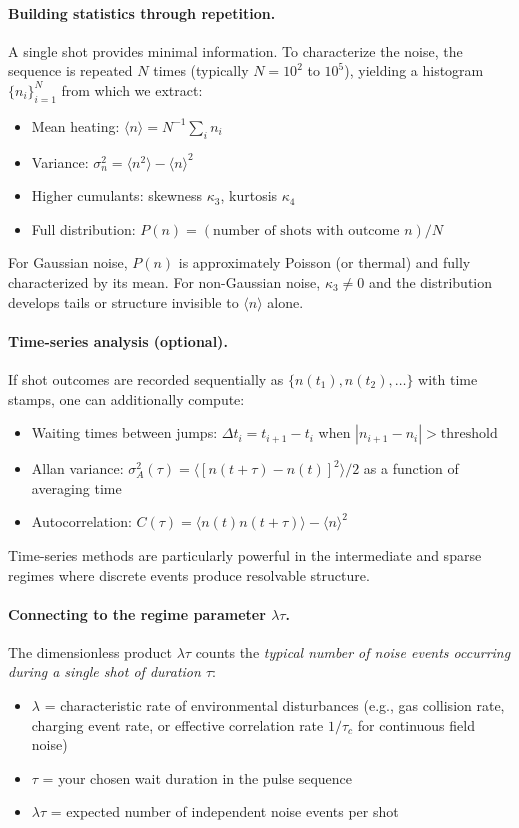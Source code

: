 \paragraph{Building statistics through repetition.}
A single shot provides minimal information. To characterize the noise, the sequence is repeated $N$ times (typically $N = 10^2$ to $10^5$), yielding a histogram $\{n_i\}_{i=1}^N$ from which we extract:
\begin{itemize}[nosep]
\item Mean heating: $\langle n \rangle = N^{-1} \sum_i n_i$
\item Variance: $\sigma^2_n = \langle n^2 \rangle - \langle n \rangle^2$
\item Higher cumulants: skewness $\kappa_3$, kurtosis $\kappa_4$
\item Full distribution: $P(n) = (\text{number of shots with outcome } n)/N$
\end{itemize}
For Gaussian noise, $P(n)$ is approximately Poisson (or thermal) and fully characterized by its mean. For non-Gaussian noise, $\kappa_3 \neq 0$ and the distribution develops tails or structure invisible to $\langle n \rangle$ alone.

\paragraph{Time-series analysis (optional).}
If shot outcomes are recorded sequentially as $\{n(t_1), n(t_2), \ldots\}$ with time stamps, one can additionally compute:
\begin{itemize}[nosep]
\item Waiting times between jumps: $\Delta t_i = t_{i+1} - t_i$ when $|n_{i+1} - n_i| > \text{threshold}$
\item Allan variance: $\sigma^2_A(\tau) = \langle [n(t+\tau) - n(t)]^2 \rangle / 2$ as a function of averaging time
\item Autocorrelation: $C(\tau) = \langle n(t) n(t+\tau) \rangle - \langle n \rangle^2$
\end{itemize}
Time-series methods are particularly powerful in the intermediate and sparse regimes where discrete events produce resolvable structure.

\paragraph{Connecting to the regime parameter $\lambda\tau$.}
The dimensionless product $\lambda\tau$ counts the \emph{typical number of noise events occurring during a single shot of duration $\tau$}:
\begin{itemize}
\item $\lambda$ = characteristic rate of environmental disturbances (e.g., gas collision rate, charging event rate, or effective correlation rate $1/\tau_c$ for continuous field noise)
\item $\tau$ = your chosen wait duration in the pulse sequence
\item $\lambda\tau$ = expected number of independent noise events per shot
\end{itemize}

